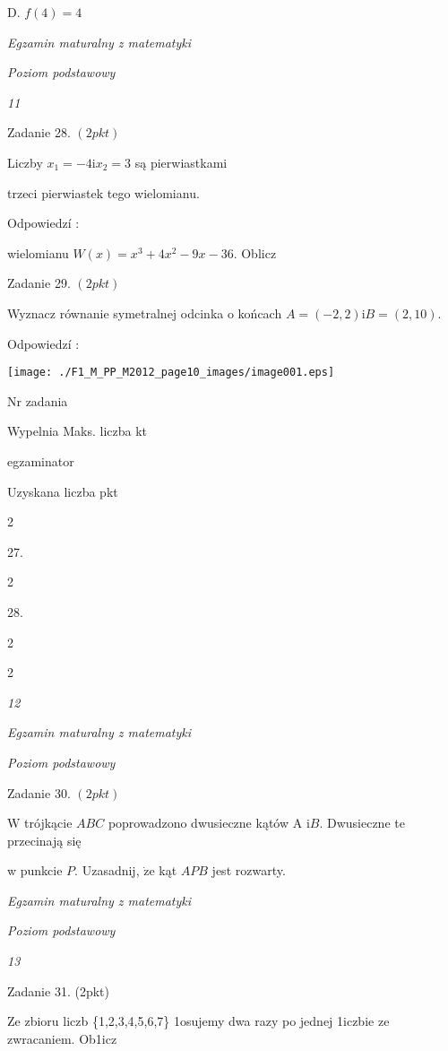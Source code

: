 \documentclass[a4paper,12pt]{article}
\begin{document}
D. $f(4)=4$





{\it Egzamin maturalny z matematyki}

{\it Poziom podstawowy}

{\it 11}

Zadanie 28. $(2pkt)$

Liczby $x_{1}=-4 \mathrm{i} x_{2}=3$ są pierwiastkami

trzeci pierwiastek tego wielomianu.

Odpowiedzí :

wielomianu $W(x)=x^{3}+4x^{2}-9x-36$. Oblicz

Zadanie 29. $(2pkt)$

Wyznacz równanie symetralnej odcinka o końcach $A=(-2,2)\mathrm{i}B=(2,10).$

Odpowiedzí :
\begin{center}
\texttt{[image: ./F1\_M\_PP\_M2012\_page10\_images/image001.eps]}
\end{center}
Nr zadania

Wypelnia Maks. liczba kt

egzaminator

Uzyskana liczba pkt

2

27.

2

28.

2

2





{\it 12}

{\it Egzamin maturalny z matematyki}

{\it Poziom podstawowy}

Zadanie 30. $(2pkt)$

$\mathrm{W}$ trójkącie $ABC$ poprowadzono dwusieczne kątów A $\mathrm{i}B$. Dwusieczne te przecinają się

w punkcie $P$. Uzasadnij, $\dot{\mathrm{z}}\mathrm{e}$ kąt $APB$ jest rozwarty.





{\it Egzamin maturalny z matematyki}

{\it Poziom podstawowy}

{\it 13}

Zadanie 31. (2pkt)

Ze zbioru liczb \{1,2,3,4,5,6,7\} 1osujemy dwa razy po jednej 1iczbie ze zwracaniem. Ob1icz
\end{document}
